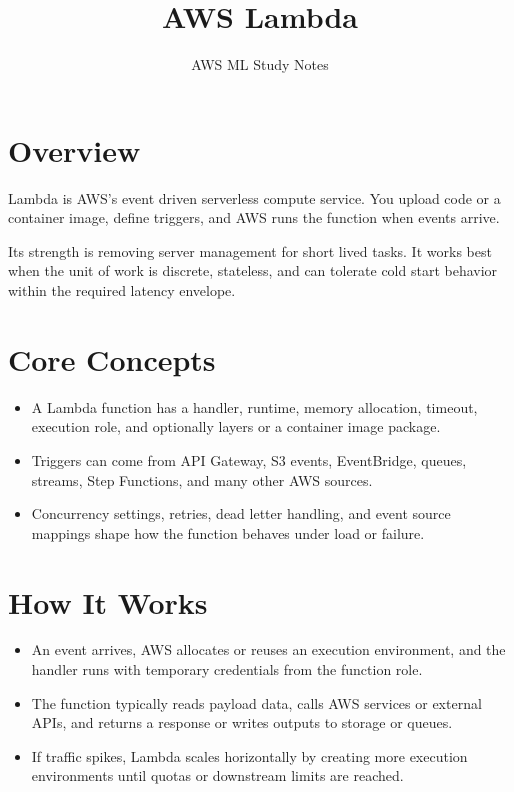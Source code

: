 \documentclass[10pt,twocolumn]{article}
\begin{document}
\title{\vspace{-1.6cm}AWS Lambda}
\author{AWS ML Study Notes}
\date{}
\maketitle
\small

\section*{Overview}
Lambda is AWS's event driven serverless compute service. You upload code or a container image, define triggers, and AWS runs the function when events arrive.

Its strength is removing server management for short lived tasks. It works best when the unit of work is discrete, stateless, and can tolerate cold start behavior within the required latency envelope.

\section*{Core Concepts}
\begin{itemize}
\item A Lambda function has a handler, runtime, memory allocation, timeout, execution role, and optionally layers or a container image package.
\item Triggers can come from API Gateway, S3 events, EventBridge, queues, streams, Step Functions, and many other AWS sources.
\item Concurrency settings, retries, dead letter handling, and event source mappings shape how the function behaves under load or failure.
\end{itemize}

\section*{How It Works}
\begin{itemize}
\item An event arrives, AWS allocates or reuses an execution environment, and the handler runs with temporary credentials from the function role.
\item The function typically reads payload data, calls AWS services or external APIs, and returns a response or writes outputs to storage or queues.
\item If traffic spikes, Lambda scales horizontally by creating more execution environments until quotas or downstream limits are reached.
\end{itemize}
\end{document}
